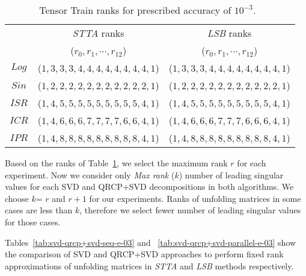 \documentclass[sigconf]{acmart}
\newcommand{\hthird}{{\it LSB}\xspace}
\newcommand{\otta}{{\it STTA}\xspace}
\begin{document}
\begin{table}[htb]
	\begin{center}
	{\small\begin{tabular}{|c|c|c|}
			\hline
			&\otta ranks & \hthird ranks\\
			& ($r_0,r_1,\cdots, r_{12}$) & ($r_0,r_1,\cdots, r_{12}$)\\ \hline
			$Log$ & ($1, 3, 3, 3, 4, 4, 4, 4, 4, 4, 4, 4, 1$) & ($1, 3, 3, 3, 4, 4, 4, 4, 4, 4, 4, 4, 1$)\\ \hline
			$Sin$ & ($1, 2, 2, 2, 2, 2, 2, 2, 2, 2, 2, 2, 1$) & ($1, 2, 2, 2, 2, 2, 2, 2, 2, 2, 2, 2, 1$)\\ \hline
			$ISR$ & ($1, 4, 5, 5, 5, 5, 5, 5, 5, 5, 5, 4, 1$) & ($1, 4, 5, 5, 5, 5, 5, 5, 5, 5, 5, 4, 1$)\\ \hline
			$ICR$ & ($1, 4, 6, 6, 6, 7, 7, 7, 7, 6, 6, 4, 1$) & ($1, 4, 6, 6, 6, 7, 7, 7, 6, 6, 6, 4, 1$)\\ \hline
			$IPR$ & ($1, 4, 8, 8, 8, 8, 8, 8, 8, 8, 8, 4, 1$) & ($1, 4, 8, 8, 8, 8, 8, 8, 8, 8, 8, 4, 1$)\\ \hline			
		\end{tabular}}
		\caption{Tensor Train ranks for prescribed accuracy of $10^{-3}$.~\label{tab:12-dim-ranks-e-3}}
	\end{center}
\end{table}

Based on the ranks of Table~\ref{tab:12-dim-ranks-e-3}, we select the maximum rank $r$ for each experiment. Now we consider only \emph{Max rank} ($k$) number of leading singular values for each SVD and QRCP+SVD decompositions in both algorithms. We choose $k$= $r$ and $r+1$ for our experiments. Ranks of unfolding matrices in some cases are less than $k$, therefore we select fewer number of leading singular values for those cases.



Tables~\ref{tab:svd-qrcp+svd-seq-e-03} and ~\ref{tab:svd-qrcp+svd-parallel-e-03} show the comparison of SVD and QRCP+SVD approaches to perform fixed rank approximations of unfolding matrices in \otta and \hthird methods respectively.    
\end{document}
